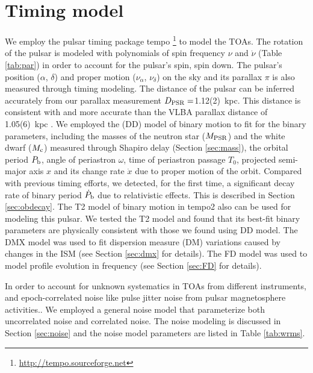 \section{Timing model}
\label{sec:model}
We employ the pulsar timing package {\sc tempo}
\footnote{\url{http://tempo.sourceforge.net}} to model the TOAs. 
The rotation of the pulsar is modeled with polynomials of spin frequency 
$\nu$ and $\dot{\nu}$ (Table \ref{tab:par}) in order to account
for the pulsar's spin, spin down.
The pulsar's position ($\alpha$, $\delta$) and proper motion ($\nu_\alpha$, $
\nu_\delta$) on the sky and its parallax $\pi$ is also measured through timing modeling. 
The distance of the pulsar can be inferred accurately from our parallax
measurement $D_{\rm PSR}=$1.12(2)~kpc. This distance is consistent with and
more accurate than the VLBA parallax distance of 1.05(6)~kpc \citep{cbv+09}.
We employed the \citet{dd86} (DD) model of binary motion to fit for the binary parameters, 
including the masses of
the neutron star ($M_{\rm PSR}$) and the white dwarf ($M_{\rm c}$) measured
through Shapiro delay (Section \ref{sec:mass}),
the orbital period $P_{\rm b}$, angle of periastron $\omega$, time of
periastron passage $T_0$, projected semi-major axis $x$ and its change rate
$\dot{x}$ due to proper motion of the orbit. 
Compared with previous timing efforts, we detected, for the first time, a
significant decay rate of binary period $\dot{P}_{\rm b}$ due to relativistic
effects. This is described in Section \ref{sec:obdecay}.    
The T2 model of binary motion in {\sc tempo2} \citep{hem06} also can be used for modeling this pulsar. We tested the T2 model and found that its best-fit binary parameters are physically consistent with those we found using DD model.
The DMX model was used to fit dispersion measure (DM) variations caused by changes in the ISM (see Section \ref{sec:dmx} for details). The FD model was used to model profile
evolution in frequency (see Section \ref{sec:FD} for details). 

{\bfref
In order to account for unknown systematics in TOAs from different
instruments, and epoch-correlated noise like pulse jitter noise from pulsar
magnetosphere activities.. 
We employed a general noise model that parameterize both uncorrelated noise and
correlated noise. The noise modeling is discussed in Section \ref{sec:noise} and the
noise model parameters are listed in Table \ref{tab:wrms}. 
}

